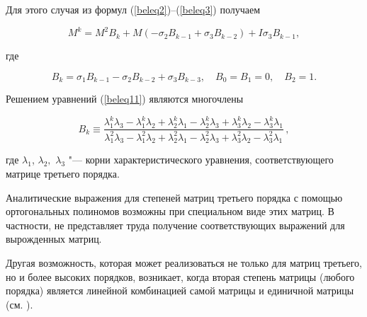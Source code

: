 \smallskip




Для этого случая из формул (\ref{beleq2})--(\ref{beleq3}) получаем

$$

M^k=M^2B_k+M(-\sigma_2B_{k-1}+\sigma_3B_{k-2})+I\sigma_3B_{k-1},

$$

где

\begin{equation}

\label{beleq11}

 B_k=\sigma_1B_{k-1}-\sigma_2B_{k-2}+\sigma_3B_{k-3},\quad B_0=B_1=0,\quad B_2=1.

\end{equation}

Решением уравнений (\ref{beleq11}) являются многочлены

\begin{equation}

\label{bekeq12} 

B_k\equiv\frac{\lambda_1^k\lambda_3-\lambda_1^k\lambda_2+\lambda_2^k\lambda_1-\lambda_2^k\lambda_3+\lambda_3^k\lambda_2-\lambda_3^k\lambda_1}{\lambda_1^2\lambda_3-\lambda_1^2\lambda_2+\lambda_2^2\lambda_1-\lambda_2^2\lambda_3+\lambda_3^2\lambda_2-\lambda_3^2\lambda_1}\,,

\end{equation}

где $\lambda_1$, $\lambda_2,$ $\lambda_3$ "--- корни характеристического уравнения, соответствующего матрице третьего порядка. 







Аналитические выражения для степеней матриц третьего порядка с помощью ортогональных полиномов возможны при специальном виде этих матриц. В частности, не представляет труда получение соответствующих выражений для вырожденных матриц. 

Другая возможность, которая может реализоваться не только для матриц третьего, но и более высоких порядков, возникает, когда вторая степень матрицы (любого порядка) является линейной комбинацией самой матрицы и единичной матрицы (см. \cite[стр.\,46]{belyayev:Belyayev1}).



\smallskip




